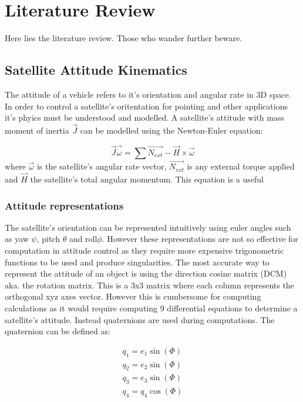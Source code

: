 
\chapter{Literature Review}
\label{chap:literature_review}

Here lies the literature review. Those who wander further beware.

\section{Satellite Attitude Kinematics}

The attitude of a vehicle refers to it's orientation and angular rate in 3D space. In order to control a satellite's
oritentation for pointing and other applications it's phyics must be understood and modelled. 
A satellite's attitude with mass moment of inertia $\vec{J}$ can be modelled using the Newton-Euler equation: 

\begin{equation}
\vec{J}\vec{\dot{\omega}} = \sum{\vec{N_{ext}}} -\vec{H}\times\vec{\omega}
\end{equation}
where $\vec{\omega}$ is the satellite's angular rate vector, $\vec{N_{ext}}$ is any external torque applied and $\vec{H}$
the satellite's total angular momentum. This equation is a useful 

\subsection{Attitude representations}
The satellite's orientation can be represented intuitively using euler angles such as yaw $\psi$, pitch $\theta$ and roll$\phi$.
However these representations are not so effective for computation in attitude control as they require more expensive trigonometric
functions to be used and produce singularities. The most accurate way to represent the attitude of an object is using the direction
cosine matrix (DCM) aka. the rotation matrix. This is a 3x3 matrix where each column represents the orthogonal xyz axes vector. However
this is cumbersome for computing calculations as it would require computing 9 differential equations to determine a satellite's 
attitude. Instead quaternions are used during computations. The quaternion can be defined as:

\begin{align}
    q_{1}=e_{1}\sin(\Phi) \\
    q_{2}=e_{2}\sin(\Phi) \\
    q_{3}=e_{3}\sin(\Phi) \\
    q_{4}=q_{4}\cos(\Phi) 
\end{align}



